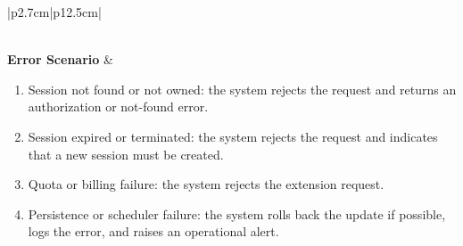 \begin{table}[H]
\begin{tabular}{|p{2.7cm}|p{12.5cm}|}
\begin{minipage}[t]{\linewidth}
\begin{enumerate}[topsep=0pt,itemsep=1pt,parsep=0pt,partopsep=0pt]
            \end{enumerate}
        \end{minipage} \\
        \hline
        \textbf{Error Scenario} & \begin{minipage}[t]{\linewidth}
            \begin{enumerate}[topsep=0pt,itemsep=1pt,parsep=0pt,partopsep=0pt]
                \item Session not found or not owned: the system rejects the request and returns an authorization or not-found error.
                \item Session expired or terminated: the system rejects the request and indicates that a new session must be created.
                \item Quota or billing failure: the system rejects the extension request.
                \item Persistence or scheduler failure: the system rolls back the update if possible, logs the error, and raises an operational alert.
            \end{enumerate}
        \end{minipage} \\
        \hline
    \end{tabular}
    \label{tab:eng-extend-session}
\end{table}

